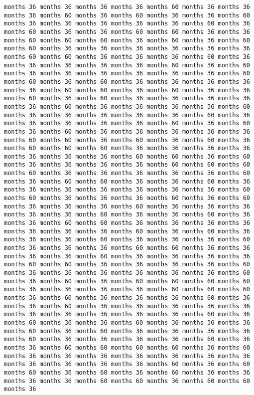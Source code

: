 \documentclass[11pt]{article}
\begin{document}
\begin{Verbatim}[commandchars=\\\{\}, frame=single, framerule=2mm, rulecolor=\color{outerrorbackground}]
months 36 months 36 months 36 months 36 months 60 months 36 months 36 months 36 months 60 months 36 months 60 months 36 months 36 months 60 months 36 months 36 months 36 months 36 months 36 months 60 months 36 months 60 months 36 months 36 months 60 months 60 months 36 months 36 months 60 months 60 months 60 months 36 months 60 months 36 months 60 months 60 months 36 months 36 months 36 months 36 months 36 months 36 months 60 months 60 months 36 months 36 months 36 months 60 months 36 months 36 months 36 months 36 months 36 months 60 months 36 months 60 months 36 months 36 months 36 months 36 months 36 months 36 months 60 months 60 months 36 months 60 months 36 months 36 months 36 months 36 months 36 months 60 months 60 months 36 months 60 months 36 months 36 months 60 months 36 months 60 months 36 months 36 months 36 months 36 months 36 months 60 months 36 months 36 months 36 months 36 months 60 months 36 months 36 months 36 months 36 months 36 months 60 months 36 months 36 months 36 months 36 months 36 months 60 months 36 months 60 months 36 months 60 months 36 months 36 months 36 months 36 months 36 months 60 months 60 months 36 months 60 months 36 months 60 months 36 months 60 months 60 months 60 months 36 months 36 months 36 months 36 months 36 months 36 months 36 months 60 months 60 months 36 months 60 months 36 months 36 months 36 months 36 months 60 months 60 months 60 months 60 months 36 months 36 months 36 months 36 months 36 months 60 months 36 months 60 months 60 months 36 months 36 months 60 months 36 months 36 months 36 months 36 months 36 months 36 months 36 months 60 months 60 months 36 months 36 months 36 months 60 months 36 months 60 months 36 months 36 months 36 months 60 months 36 months 36 months 36 months 36 months 36 months 60 months 36 months 36 months 60 months 36 months 36 months 60 months 60 months 36 months 36 months 36 months 36 months 36 months 36 months 36 months 60 months 36 months 60 months 36 months 36 months 36 months 60 months 36 months 36 months 36 months 60 months 36 months 36 months 36 months 60 months 60 months 36 months 36 months 36 months 36 months 60 months 36 months 36 months 36 months 36 months 60 months 60 months 36 months 36 months 36 months 36 months 60 months 36 months 36 months 36 months 36 months 36 months 36 months 60 months 36 months 60 months 36 months 60 months 60 months 60 months 60 months 36 months 36 months 36 months 36 months 60 months 60 months 60 months 36 months 60 months 36 months 36 months 36 months 60 months 36 months 36 months 60 months 36 months 36 months 36 months 36 months 36 months 36 months 36 months 36 months 36 months 36 months 60 months 36 months 60 months 36 months 36 months 60 months 36 months 36 months 36 months 60 months 36 months 60 months 36 months 36 months 36 months 36 months 60 months 36 months 36 months 36 months 36 months 60 months 36 months 36 months 60 months 60 months 60 months 60 months 36 months 60 months 36 months 36 months 36 months 36 months 36 months 36 months 36 months 36 months 36 months 36 months 36 months 60 months 36 months 60 months 60 months 36 months 60 months 36 months 60 months 36 months 36 months 36 months 36 months 60 months 60 months 36 months 60 months 60 months 36 
\end{Verbatim}
\end{document}
